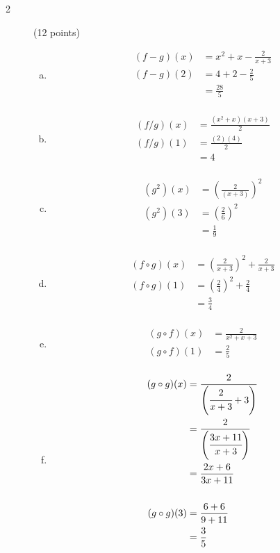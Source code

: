 \documentclass{exam}
\begin{document}
\begin{description}
\begin{enumerate}[(a)]
\end{enumerate}

\item[2] (12 points)
\begin{enumerate}[(a)]

\item 
\begin{align*}
  (f - g)(x) &= x^2 + x - \frac{2}{x+3} \\
  (f - g)(2) &= 4 + 2 - \frac{2}{5} \\
             &= \frac{28}{5} \\
\end{align*} 

\item 
\begin{align*}
  (f/g)(x) &= \frac{(x^2 + x)(x+3)}{2} \\
  (f/g)(1) &= \frac{(2)(4)}{2} \\
           &= 4 \\
\end{align*} 

\item 
\begin{align*}
  (g^2)(x) &= \left( \frac{2}{(x+3)} \right)^2 \\
  (g^2)(3) &= \left( \frac{2}{6} \right)^2\\
           &= \frac{1}{9} \\
\end{align*} 

\item 
\begin{align*}
  (f \circ g)(x) &= \left( \frac{2}{x+3} \right)^2 + \frac{2}{x+3} \\
  (f \circ g)(1) &= \left( \frac{2}{4} \right)^2 + \frac{2}{4} \\
                 &= \frac{3}{4} \\
\end{align*} 

\item 
\begin{align*}
  (g \circ f)(x) &= \frac{2}{x^2 + x + 3} \\
  (g \circ f)(1) &= \frac{2}{5} \\
\end{align*} 

\item 
\begin{align*}
  (g \circ g)(x) &= \frac{2}{\left( \cfrac{2}{x+3} + 3 \right)} \\
                 &= \frac{2}{\left( \cfrac{3x + 11}{x+3} \right)} \\
                 &= \frac{2x + 6}{3x + 11} \\
                 \\
  (g \circ g)(3) &= \frac{6 + 6}{9 + 11} \\
                 &= \frac{3}{5} \\
\end{align*} 


\end{enumerate}
\end{description}
\end{document}
